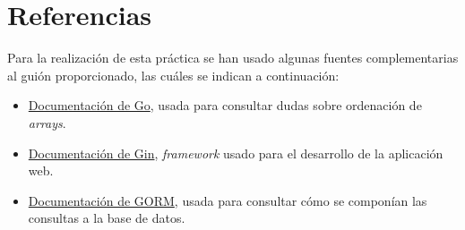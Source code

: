 \section{Referencias}

Para la realización de esta práctica se han usado algunas fuentes complementarias al guión proporcionado, las cuáles se indican a continuación:

\begin{itemize}
    \item \href{https://golang.org/doc/}{Documentación de Go}, usada para consultar dudas sobre ordenación de \textit{arrays}.
    \item \href{https://gin-gonic.com/docs/}{Documentación de Gin}, \textit{framework} usado para el desarrollo de la aplicación web.
    \item \href{https://gorm.io/docs/}{Documentación de GORM}, usada para consultar cómo se componían las consultas a la base de datos.
\end{itemize}